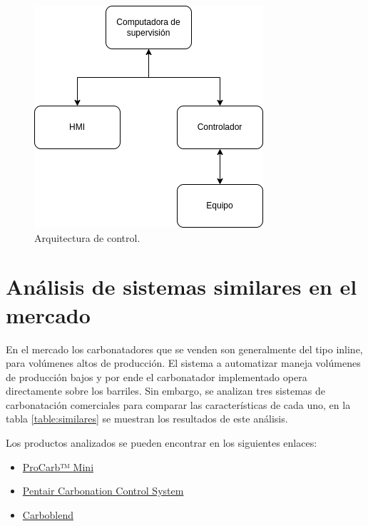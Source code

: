 \begin{figure}[H]
  \centering
  \includegraphics[width=0.5\linewidth]{introduccion-general/img/arquitectura-de-control.png}
  \caption{Arquitectura de control.}
  \label{fig:arquitectura-de-control}
\end{figure}

\section{Análisis de sistemas similares en el mercado}

En el mercado los carbonatadores que se venden son generalmente del tipo inline, para volúmenes altos de producción. El sistema a automatizar maneja volúmenes de producción bajos y por ende el carbonatador implementado opera directamente sobre los barriles. Sin embargo, se analizan tres sistemas de carbonatación comerciales para comparar las características de cada uno, en la tabla \ref{table:similares} se muestran los resultados de este análisis.

Los productos analizados se pueden encontrar en los siguientes enlaces:

\begin{itemize}
\item \href{https://www.probrew.com/products/procarb-mini/}{ProCarb™ Mini}
\item \href{https://foodandbeverage.pentair.com/en/products/pentair-carbonation-control-system-carbo-controller-ccr?utm_source=google&utm_medium=cpc&utm_term=HGB+Carbonator&utm_content=digital_ad&utm_campaign=CCR_awareness_2024}{Pentair Carbonation Control System}
\item \href{https://www.alfalaval.com/products/process-solutions/brewery-solutions/blending-modules/carboblend/}{Carboblend}
\end{itemize}

